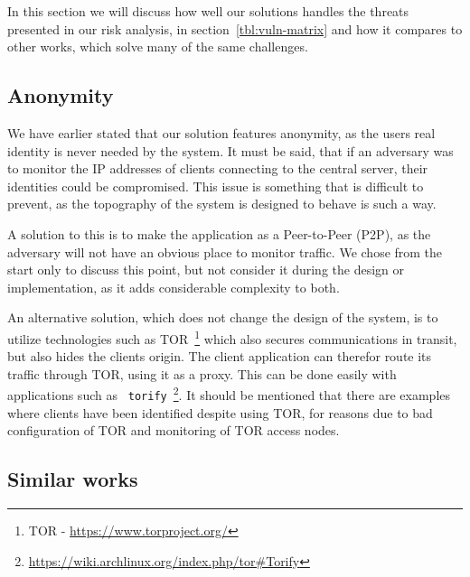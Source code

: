 
In this section we will discuss how well our solutions handles the
threats presented in our risk analysis, in
section~\ref{tbl:vuln-matrix} and how it compares to other works,
which solve many of the same challenges.




\subsection{Anonymity}

We have earlier stated that our solution features anonymity, as the
users real identity is never needed by the system. It must be said,
that if an adversary was to monitor the IP addresses of clients
connecting to the central server, their identities could be
compromised. This issue is something that is difficult to prevent, as
the topography of the system is designed to behave is such a way.

A solution to this is to make the application as a Peer-to-Peer (P2P),
as the adversary will not have an obvious place to monitor traffic. We
chose from the start only to discuss this point, but not consider it
during the design or implementation, as it adds considerable
complexity to both.

An alternative solution, which does not change the design of the
system, is to utilize technologies such as TOR~\footnote{TOR -
  \url{https://www.torproject.org/}} which also secures communications
in transit, but also hides the clients origin. The client application
can therefor route its traffic through TOR, using it as a proxy. This
can be done easily with applications such as {\tt
  torify}~\footnote{\url{https://wiki.archlinux.org/index.php/tor\#Torify}}. It
should be mentioned that there are examples where clients have been
identified despite using TOR, for reasons due to bad configuration of
TOR and monitoring of TOR access nodes.


\subsection{Similar works}

